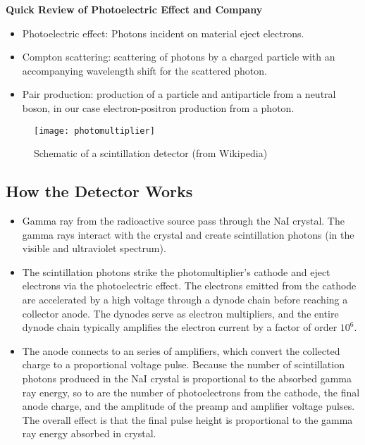 \documentclass[11pt, a4paper]{article}
\begin{document}
\textbf{Quick Review of Photoelectric Effect and Company}
\begin{itemize}
	\item Photoelectric effect: Photons incident on material eject electrons.
	\item Compton scattering: scattering of photons by a charged particle with an accompanying wavelength shift for the scattered photon.
	\item Pair production: production of a particle and antiparticle from a neutral boson, in our case electron-positron production from a photon.
\end{itemize}


\begin{figure}
\centering
\texttt{[image: photomultiplier]}
\caption{Schematic of a scintillation detector (from Wikipedia)}
\end{figure}


\subsection{How the Detector Works}
\begin{itemize}
	\item Gamma ray from the radioactive source pass through the NaI crystal. The gamma rays interact with the crystal and create scintillation photons (in the visible and ultraviolet spectrum). 
	
	\item The scintillation photons strike the photomultiplier's cathode and eject electrons via the photoelectric effect. The electrons emitted from the cathode are accelerated by a high voltage through a dynode chain before reaching a collector anode. The dynodes serve as electron multipliers, and the entire dynode chain typically amplifies the electron current by a factor of order $ 10^{6} $. 
	
	\item The anode connects to an series of amplifiers, which convert the collected charge to a proportional voltage pulse. Because the number of scintillation photons produced in the NaI crystal is proportional to the absorbed gamma ray energy, so to are the number of photoelectrons from the cathode, the final anode charge, and the amplitude of the preamp and amplifier voltage pulses. The overall effect is that the final pulse height is proportional to the gamma ray energy absorbed in crystal.
\end{itemize}
\end{document}
